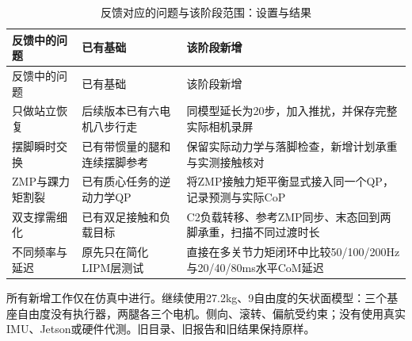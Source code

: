 \FloatBarrier\begingroup\small\setlength{\tabcolsep}{2.5pt}
\begin{longtable}[]{@{}
  >{\raggedright\arraybackslash}p{}
  >{\raggedright\arraybackslash}p{}
  >{\raggedright\arraybackslash}p{}@{}}
\caption{反馈对应的问题与该阶段范围：设置与结果}\label{tab:s22-1}\tabularnewline
\toprule\noalign{}
\begin{minipage}[b]{\linewidth}\raggedright
反馈中的问题
\end{minipage} & \begin{minipage}[b]{\linewidth}\raggedright
已有基础
\end{minipage} & \begin{minipage}[b]{\linewidth}\raggedright
该阶段新增
\end{minipage} \\
\midrule\noalign{}
\endfirsthead
\toprule\noalign{}
\begin{minipage}[b]{\linewidth}\raggedright
反馈中的问题
\end{minipage} & \begin{minipage}[b]{\linewidth}\raggedright
已有基础
\end{minipage} & \begin{minipage}[b]{\linewidth}\raggedright
该阶段新增
\end{minipage} \\
\midrule\noalign{}
\endhead
\bottomrule\noalign{}
\endlastfoot
只做站立恢复 & 后续版本已有六电机八步行走 & 同模型延长为20步，加入推扰，并保存完整实际相机录屏 \\
摆脚瞬时交换 & 已有带惯量的腿和连续摆脚参考 & 保留实际动力学与落脚检查，新增计划承重与实测接触核对 \\
ZMP与踝力矩割裂 & 已有质心任务的逆动力学QP & 将ZMP接触力矩平衡显式接入同一个QP，记录预测与实际CoP \\
双支撑需细化 & 已有双足接触和负载目标 & C2负载转移、参考ZMP同步、末态回到两脚承重，扫描不同过渡时长 \\
不同频率与延迟 & 原先只在简化LIPM层测试 & 直接在多关节力矩闭环中比较50/100/200Hz与20/40/80ms水平CoM延迟 \\
\end{longtable}\endgroup

所有新增工作仅在仿真中进行。继续使用27.2kg、9自由度的矢状面模型：三个基座自由度没有执行器，两腿各三个电机。侧向、滚转、偏航受约束；没有使用真实IMU、Jetson或硬件代测。旧目录、旧报告和旧结果保持原样。

